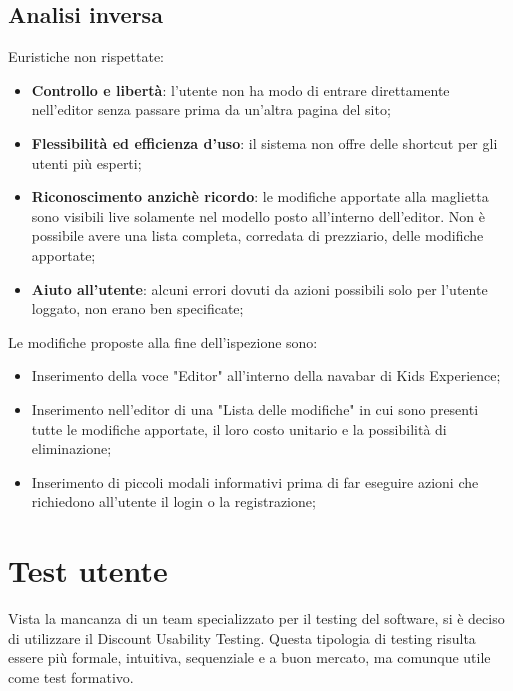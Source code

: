 \documentclass[12pt,italian,]{report}
\begin{document}
\subsection{Analisi inversa} 

Euristiche non rispettate:

\begin{itemize}
\item \textbf{Controllo e libertà}: l'utente non ha modo di entrare direttamente nell'editor senza passare prima da un'altra pagina del sito;

\item \textbf{Flessibilità ed efficienza d'uso}: il sistema non offre delle shortcut per gli utenti più esperti;

\item \textbf{Riconoscimento anzichè ricordo}: le modifiche apportate alla maglietta sono visibili live solamente nel modello posto all'interno dell'editor. Non è possibile avere una lista completa, corredata di prezziario, delle modifiche apportate;

\item \textbf{Aiuto all'utente}: alcuni errori dovuti da azioni possibili solo per l'utente loggato, non erano ben specificate;
\end{itemize}

Le modifiche proposte alla fine dell'ispezione sono:
\begin{itemize}
\item Inserimento della voce "Editor" all'interno della navabar di Kids Experience;
\item Inserimento nell'editor di una "Lista delle modifiche" in cui sono presenti tutte le modifiche apportate, il loro costo unitario e la possibilità di eliminazione;
\item Inserimento di piccoli modali informativi prima di far eseguire azioni che richiedono all'utente il login o la registrazione; 
\end{itemize}



\hypertarget{test-utente}{%
\section{Test utente}\label{test-utente}}

Vista la mancanza di un team specializzato per il testing del software,
si è deciso di utilizzare il Discount Usability Testing. Questa
tipologia di testing risulta essere più formale, intuitiva, sequenziale
e a buon mercato, ma comunque utile come test formativo.
\end{document}
